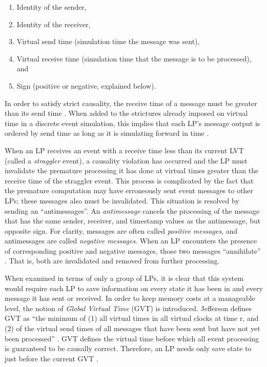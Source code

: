 \documentclass[11pt]{book}
\begin{document}
\begin{enumerate}
  \item Identity of the sender,
  \item Identity of the receiver,
  \item Virtual send time (simulation time the message was sent),
  \item Virtual receive time (simulation time that the message is to be processed), and
  \item Sign (positive or negative, explained below).
\end{enumerate}

\noindent
In order to satisfy strict causality, the receive time of a message must be greater than
its send time \cite{lamport-78}.  When added to the strictures already imposed on virtual
time in a discrete event simulation, this implies that each LP's message output is ordered
by send time as long as it is simulating forward in time \cite{jefferson-85}.

When an LP receives an event with a receive time less than its current LVT (called a
\emph{straggler} event), a causality violation has occurred and the LP must invalidate the
premature processing it has done at virtual times greater than the receive time of the
straggler event.  This process is complicated by the fact that the premature computation
may have erroneously sent event messages to other LPs; these messages also must be
invalidated.  This situation is resolved by sending an ``antimessages''.  An
\emph{antimessage} cancels the processing of the message that has the same sender,
receiver, and timestamp values as the antimessage, but opposite sign.  For clarity,
messages are often called \emph{positive messages}, and antimessages are called
\emph{negative messages}.  When an LP encounters the presence of corresponding positive
and negative messages, those two messages ``annihilate'' \cite{jefferson-85}.  That is,
both are invalidated and removed from further processing.

When examined in terms of only a group of LPs, it is clear that this system would require
each LP to save information on every state it has been in and every message it has sent or
received.  In order to keep memory costs at a manageable level, the notion of \emph{Global
  Virtual Time} (GVT) is introduced.  Jefferson defines GVT as ``the minimum of (1) all
virtual times in all virtual clocks at time r, and (2) of the virtual send times of all
messages that have been sent but have not yet been processed'' \cite{jefferson-85}.  GVT
defines the virtual time before which all event processing is guaranteed to be causally
correct.  Therefore, an LP needs only save state to just before the current GVT
\cite{fujimoto-89b}.
\end{document}
